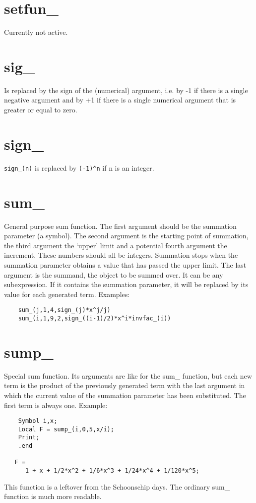 \section{setfun\_}
\label{funsetfun}
\noindent Currently not active.

\section{sig\_}
\label{funsig}
\noindent Is replaced by the sign of the (numerical) argument, i.e. by -1 
if there is a single negative argument and by +1 if there is a single 
numerical argument that is greater or equal to zero.

\section{sign\_}
\label{funsign}
\noindent \verb:sign_(n): is replaced by \verb:(-1)^n: if n is an 
integer.

\section{sum\_}
\label{funsum}
\noindent General purpose sum function. The first argument should 
be the summation parameter (a symbol). The second argument is the starting 
point of summation, the third argument the `upper' limit and a potential 
fourth argument the increment. These numbers should all be integers. 
Summation stops when the summation parameter obtains a value that has 
passed the upper limit. The last argument is the summand, the object to be 
summed over. It can be any subexpression. If it contains the summation 
parameter, it will be replaced by its value for each generated term. 
Examples:
\begin{verbatim}
    sum_(j,1,4,sign_(j)*x^j/j)
    sum_(i,1,9,2,sign_((i-1)/2)*x^i*invfac_(i))
\end{verbatim}

\section{sump\_}
\label{funsump}
\noindent Special sum function. Its arguments are like for the 
sum\_ function, but each new term is the product of the previously 
generated term with the last argument in which the current value of the 
summation parameter has been substituted. The first term is always one. 
Example:
\begin{verbatim}
    Symbol i,x;
    Local F = sump_(i,0,5,x/i);
    Print;
    .end

   F =
      1 + x + 1/2*x^2 + 1/6*x^3 + 1/24*x^4 + 1/120*x^5;
\end{verbatim}
This function is a leftover from the Schoonschip days. 
The ordinary sum\_ function is much more readable.

